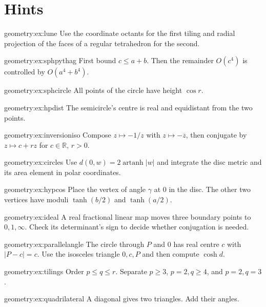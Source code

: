 \section{Hints}

\begin{hint}{geometry:ex:lune}
Use the coordinate octants for the first tiling and radial projection of
the faces of a regular tetrahedron for the second.
\end{hint}
\begin{hint}{geometry:ex:sphpythag}
First bound $c\le a+b$. Then the remainder $O(c^4)$ is controlled by
$O(a^4+b^4)$.
\end{hint}
\begin{hint}{geometry:ex:sphcircle}
All points of the circle have height $\cos r$.
\end{hint}
\begin{hint}{geometry:ex:hpdist}
The semicircle's centre is real and equidistant from the two points.
\end{hint}
\begin{hint}{geometry:ex:inversioniso}
Compose $z\mapsto-1/z$ with $z\mapsto-\overline z$, then conjugate
by $z\mapsto c+rz$ for $c\in\mathbb R$, $r>0$.
\end{hint}
\begin{hint}{geometry:ex:circles}
Use $d(0,w)=2\operatorname{artanh}|w|$ and integrate the disc metric
and its area element in polar coordinates.
\end{hint}
\begin{hint}{geometry:ex:hypcos}
Place the vertex of angle $\gamma$ at $0$ in the disc. The other two
vertices have moduli $\tanh(b/2)$ and $\tanh(a/2)$.
\end{hint}
\begin{hint}{geometry:ex:ideal}
A real fractional linear map moves three boundary points to $0,1,\infty$.
Check its determinant's sign to decide whether conjugation is needed.
\end{hint}
\begin{hint}{geometry:ex:parallelangle}
The circle through $P$ and $0$ has real centre $c$ with $|P-c|=c$.
Use the isosceles triangle $0,c,P$ and then compute $\cosh d$.
\end{hint}
\begin{hint}{geometry:ex:tilings}
Order $p\le q\le r$. Separate $p\ge3$, $p=2,q\ge4$, and $p=2,q=3$.
\end{hint}
\begin{hint}{geometry:ex:quadrilateral}
A diagonal gives two triangles. Add their angles.
\end{hint}

